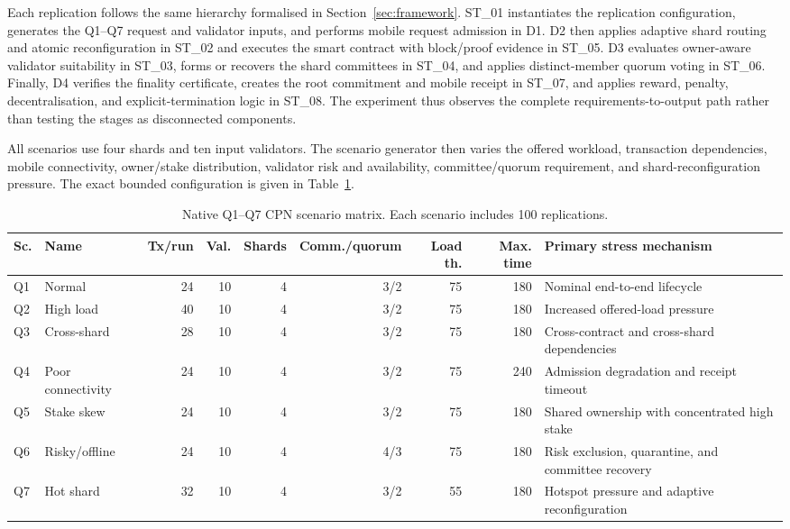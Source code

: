 \documentclass[a4paper,fleqn]{cas-sc}
\begin{document}
Each replication follows the same hierarchy formalised in
Section~\ref{sec:framework}. ST\_01 instantiates the replication configuration,
generates the Q1--Q7 request and validator inputs, and performs mobile request
admission in D1. D2 then applies adaptive shard routing and atomic
reconfiguration in ST\_02 and executes the smart contract with block/proof
evidence in ST\_05. D3 evaluates owner-aware validator suitability in ST\_03,
forms or recovers the shard committees in ST\_04, and applies distinct-member
quorum voting in ST\_06. Finally, D4 verifies the finality certificate, creates
the root commitment and mobile receipt in ST\_07, and applies reward, penalty,
decentralisation, and explicit-termination logic in ST\_08. The experiment thus
observes the complete requirements-to-output path rather than testing the
stages as disconnected components.

All scenarios use four shards and ten input validators. The scenario generator
then varies the offered workload, transaction dependencies, mobile
connectivity, owner/stake distribution, validator risk and availability,
committee/quorum requirement, and shard-reconfiguration pressure. The exact
bounded configuration is given in Table~\ref{tab:scenario_parameters}.

\begin{table}[pos=t]
\centering
\caption{Native Q1--Q7 CPN scenario matrix. Each scenario includes 100 replications.}
\label{tab:scenario_parameters}
\scriptsize
\setlength{\tabcolsep}{3.2pt}
\renewcommand{\arraystretch}{1.10}
\begin{tabularx}{\textwidth}{llrrrrrrX}
\toprule
\textbf{Sc.} & \textbf{Name} & \textbf{Tx/run} & \textbf{Val.} &
\textbf{Shards} & \textbf{Comm./quorum} & \textbf{Load th.} &
\textbf{Max. time} & \textbf{Primary stress mechanism} \\
\midrule
Q1 & Normal & 24 & 10 & 4 & 3/2 & 75 & 180 & Nominal end-to-end lifecycle \\
Q2 & High load & 40 & 10 & 4 & 3/2 & 75 & 180 & Increased offered-load pressure \\
Q3 & Cross-shard & 28 & 10 & 4 & 3/2 & 75 & 180 & Cross-contract and cross-shard dependencies \\
Q4 & Poor connectivity & 24 & 10 & 4 & 3/2 & 75 & 240 & Admission degradation and receipt timeout \\
Q5 & Stake skew & 24 & 10 & 4 & 3/2 & 75 & 180 & Shared ownership with concentrated high stake \\
Q6 & Risky/offline & 24 & 10 & 4 & 4/3 & 75 & 180 & Risk exclusion, quarantine, and committee recovery \\
Q7 & Hot shard & 32 & 10 & 4 & 3/2 & 55 & 180 & Hotspot pressure and adaptive reconfiguration \\
\bottomrule
\end{tabularx}
\end{table}
\end{document}
